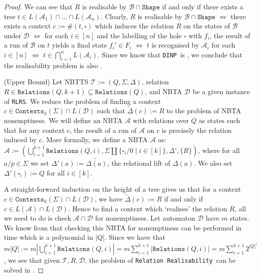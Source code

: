 \documentclass[12pt, a4paper]{article}
\newcommand{\intersectionNonemptiness}{\texttt{DINP}}
\newcommand{\relationRealisability}{\texttt{RLRS}}
\newcommand{\relationRealisabilityFull}{\texttt{Relation Realisability}}
\newcommand{\T}{\mathcal{T}}
\newcommand{\D}{\mathcal{D}}
\newcommand{\Alphabet}{\ensuremath{\Sigma}}
\newcommand{\Contexts}[2]{\ensuremath{\texttt{Contexts}_{#2}\left(#1\right)}}
\newcommand{\Transitions}{\ensuremath{\Delta}}
\newcommand{\Relations}{\texttt{Relations}}
\newcommand{\shape}{\texttt{Shape}}
\newcommand{\automaton}{\ensuremath{\mathcal{A}}}
\newcommand{\automatonB}{\ensuremath{\mathcal{B}}}
\begin{document}
\begin{proof}
    We can see that $R$ is realisable by $\automatonB \cap \shape$ if and only if there exists a tree $t \in L(\automaton_1) \cap \dots \cap L(\automaton_n)$. Clearly, $R$ is realisable by $\automatonB \cap \shape$ $\iff$ there exists a context $c := \#(t, \square)$ which induces the relation $R$ on the states of $\automatonB$ under $\D$ $\iff$ for each $i \in [n]$ and the labelling of the hole $\square$ with $f_i$, the result of a run of $\automatonB$ on $t$ yields a final state $f_i' \in F_i$ $\iff$ $t$ is recognised by $\automaton_i$ for each $i \in [n]$ $\iff$ $t \in \bigcap_{i=1}^n L(\automaton_i)$. Since we know that \intersectionNonemptiness\ is \expth, we conclude that the realisability problem is also \expth.
    
    \medskip
    
    (Upper Bound) Let NBTTS $\T := (Q, \Alphabet, \Transitions)$, relation $R \in \Relations(Q, k+1) \subseteq \Relations(Q)$, and NBTA $\D$ be a given instance of \relationRealisability. We reduce the problem of finding a context $c \in \Contexts{\Alphabet}{k} \cap L(\D)$ such that $\widetilde{\Transitions}(c) := R$ to the problem of NBTA nonemptiness. We will define an NBTA $\automaton$ with relations over $Q$ as states such that for any context $c$, the result of a run of $\automaton$ on $c$ is precisely the relation induced by $c$. More formally, we define a NBTA $\automaton$ as: $\automaton := (\bigcup_{i=1}^{k+1} \Relations(Q, i), \Alphabet \coprod \{\square_i/0 \mid i \in [k]\}, \Transitions', \{R\})$, where for all $a/p \in \Alphabet$ we set $\Transitions'(a) := \widetilde{\Transitions(a)}$, the relational lift of $\Transitions(a)$. We also set $\Transitions'(\square_i) := Q$ for all $i \in [k]$.
    
    A straight-forward induction on the height of a tree gives us that for a context $c \in \Contexts{\Alphabet}{k} \cap L(\D)$, we have $\widetilde{\Transitions}(c) := R$ if and only if $c \in L(\automaton) \cap L(\D)$. Hence to find a context which `realises' the relation $R$, all we need to do is check $\automaton \cap \D$ for nonemptiness. Let automaton $\D$ have $m$ states. We know from \cite{tata} that checking this NBTA for nonemptiness can be performed in time which is a polynomial in $|Q|$. Since we have that $m|Q| := m|\bigcup_{i=1}^{k+1} \Relations(Q, i)| = m\sum_{i=1}^{k+1}|\Relations(Q, i)| = m\sum_{i=1}^{k+1}2^{|Q|^i}$, we see that given $\T, R, \D$, the problem of \relationRealisabilityFull\ can be solved in \expt.
\end{proof}
\end{document}
